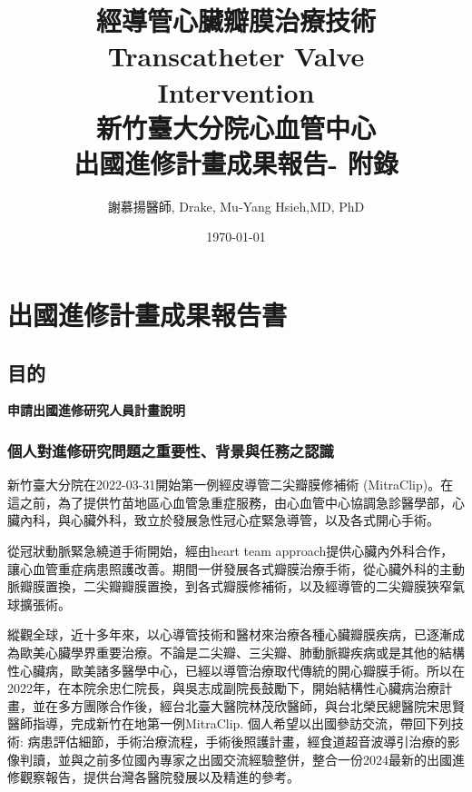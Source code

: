 \documentclass[nols]{tufte-book}
\begin{document}


\title[Structural Heart Disease Intervention]{
\logos
\textbf{經導管心臟瓣膜治療技術\\
Transcatheter Valve\\ Intervention\\
新竹臺大分院心血管中心 \\ 
出國進修計畫成果報告- 附錄}}
\author{謝慕揚醫師, Drake, Mu-Yang Hsieh,MD, PhD}
\date{\today}




\tableofcontents

\onehalfspacing


\chapter{出國進修計畫成果報告書}

\thispagestyle{plain}

\setcounter{page}{1}

\section{目的}

\textbf{申請出國進修研究人員計畫說明}

\subsection{個人對進修研究問題之重要性、背景與任務之認識} 
新竹臺大分院在2022-03-31開始第一例經皮導管二尖瓣膜修補術 (MitraClip)。在這之前，為了提供竹苗地區心血管急重症服務，由心血管中心協調急診醫學部，心臟內科，與心臟外科，致立於發展急性冠心症緊急導管，以及各式開心手術。

從冠狀動脈緊急繞道手術開始，經由heart team approach提供心臟內外科合作，讓心血管重症病患照護改善。期間一併發展各式瓣膜治療手術，從心臟外科的主動脈瓣膜置換，二尖瓣瓣膜置換，到各式瓣膜修補術，以及經導管的二尖瓣膜狹窄氣球擴張術。

縱觀全球，近十多年來，以心導管技術和醫材來治療各種心臟瓣膜疾病，已逐漸成為歐美心臟學界重要治療。不論是二尖瓣、三尖瓣、肺動脈瓣疾病或是其他的結構性心臟病，歐美諸多醫學中心，已經以導管治療取代傳統的開心瓣膜手術。所以在2022年，在本院余忠仁院長，與吳志成副院長鼓勵下，開始結構性心臟病治療計畫，並在多方團隊合作後，經台北臺大醫院林茂欣醫師，與台北榮民總醫院宋思賢醫師指導，完成新竹在地第一例MitraClip. 個人希望以出國參訪交流，帶回下列技術: 病患評估細節，手術治療流程，手術後照護計畫，經食道超音波導引治療的影像判讀，並與之前多位國內專家之出國交流經驗整併，整合一份2024最新的出國進修觀察報告，提供台灣各醫院發展以及精進的參考。
\end{document}
